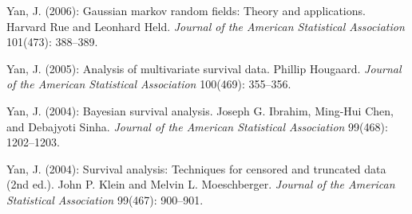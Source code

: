 \begin{BookReviews}

\item Yan, J. (2006): Gaussian markov random fields: Theory and applications.
Harvard Rue and Leonhard Held. \emph{Journal of the American Statistical
Association} 101(473): 388--389.

\item Yan, J. (2005): Analysis of multivariate survival data. Phillip
Hougaard. \emph{Journal of the American Statistical Association}
100(469): 355--356.

\item Yan, J. (2004): Bayesian survival analysis. Joseph G. Ibrahim, Ming-Hui
Chen, and Debajyoti Sinha. \emph{Journal of the American Statistical
Association} 99(468): 1202--1203.

\item Yan, J. (2004): Survival analysis: Techniques for censored and truncated
data (2nd ed.). John P. Klein and Melvin L. Moeschberger. \emph{Journal
of the American Statistical Association} 99(467): 900--901.

\end{BookReviews}

